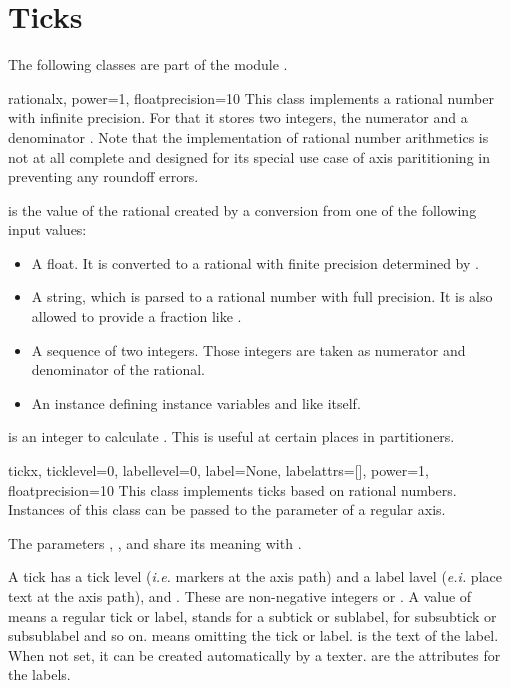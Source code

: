 \section{Ticks}


The following classes are part of the module .

\begin{classdesc}{rational}{x, power=1, floatprecision=10}
  This class implements a rational number with infinite precision. For
  that it stores two integers, the numerator  and a
  denominator . Note that the implementation of rational
  number arithmetics is not at all complete and designed for its
  special use case of axis parititioning in \PyX{} preventing any
  roundoff errors.

   is the value of the rational created by a conversion from
  one of the following input values:
  \begin{itemize}
  \item A float. It is converted to a rational with finite precision
    determined by .
  \item A string, which is parsed to a rational number with full
    precision. It is also allowed to provide a fraction like
    .
  \item A sequence of two integers. Those integers are taken as
    numerator and denominator of the rational.
  \item An instance defining instance variables  and
   like  itself.
  \end{itemize}

   is an integer to calculate .
  This is useful at certain places in partitioners.
\end{classdesc}

\begin{classdesc}{tick}{x, ticklevel=0, labellevel=0, label=None,
                        labelattrs=[], power=1, floatprecision=10}
  This class implements ticks based on rational numbers. Instances of
  this class can be passed to the  parameter of a
  regular axis.

  The parameters , , and  share
  its meaning with .

  A tick has a tick level (\emph{i.e.} markers at the axis path) and a
  label lavel (\emph{e.i.} place text at the axis path),
   and . These are non-negative
  integers or . A value of  means a regular tick or
  label,  stands for a subtick or sublabel,  for
  subsubtick or subsublabel and so on.  means omitting the
  tick or label.  is the text of the label. When not set,
  it can be created automatically by a texter.  are
  the attributes for the labels.
\end{classdesc}

